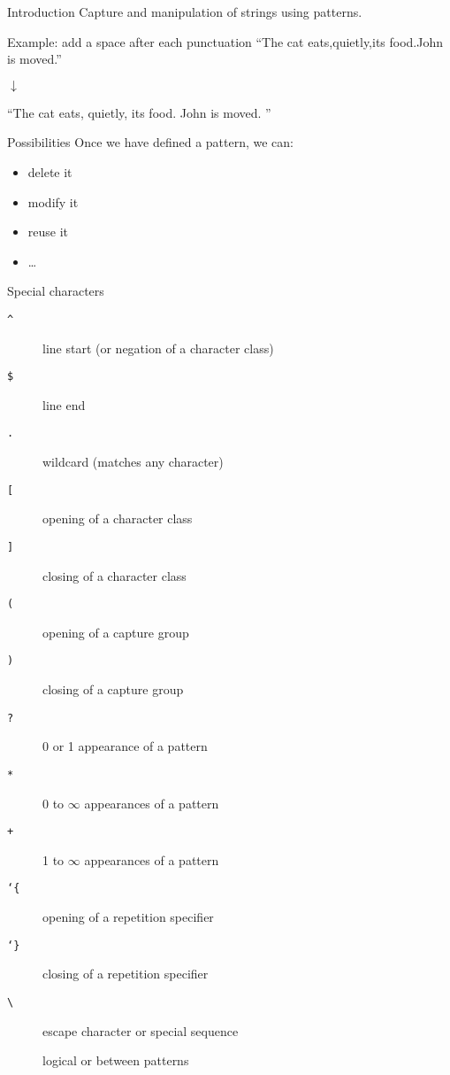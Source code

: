 \begin{frame}{Introduction}
  Capture and manipulation of strings using patterns.

  \begin{exampleblock}{Example: add a space after each punctuation}
    \centering
    “The cat eats,quietly,its food.John is moved.”

    $\downarrow$

    “The cat eats, quietly, its food. John is moved. ”
  \end{exampleblock}
\end{frame}

\begin{frame}{Possibilities}
  Once we have defined a pattern, we can:
  \begin{itemize}
  \item delete it
  \item modify it
  \item reuse it
  \item …
  \end{itemize}
\end{frame}

\begin{frame}{Special characters}
  \begin{description}
  \item[\texttt{\^{}}] line start (or negation of a character class)
  \item[\texttt{\$}] line end
  \item[\texttt{.}] wildcard (matches any character) 
  \item[\texttt{[}] opening of a character class
  \item[\texttt{]}] closing of a character class
  \item[\texttt{(}] opening of a capture group
  \item[\texttt{)}] closing of a capture group
  \item[\texttt{?}] 0 or 1 appearance of a pattern
  \item[\texttt{*}] 0 to $\infty$ appearances of a pattern
  \item[\texttt{+}] 1 to $\infty$ appearances of a pattern
  \item[\texttt{\char`\{}] opening of a repetition specifier
  \item[\texttt{\char`\}}] closing of a repetition specifier
  \item[\texttt{\textbackslash}] escape character or special sequence
  \item[\texttt{\textbar}] logical or between patterns
  \end{description}
\end{frame}

